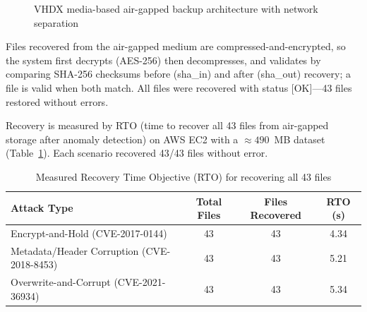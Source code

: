\documentclass{iaesarticle}
\begin{document}
\begin{figure}[htbp]
\centering
{}
\vspace{.4em}
\caption{VHDX media-based air-gapped backup architecture with network separation}
\label{fig:vhdx}
\end{figure}

Files recovered from the air-gapped medium are compressed-and-encrypted, so the system first decrypts (AES-256) then decompresses, and validates by comparing SHA-256 checksums before (sha\_in) and after (sha\_out) recovery; a file is valid when both match. All files were recovered with status [OK]---43 files restored without errors.

Recovery is measured by RTO (time to recover all 43 files from air-gapped storage after anomaly detection) on AWS EC2 with a $\approx490$~MB dataset (Table~\ref{tab:rto}). Each scenario recovered 43/43 files without error.

\begin{table}[htbp]
\centering
\fontsize{8pt}{10pt}\selectfont
\caption{Measured Recovery Time Objective (RTO) for recovering all 43 files}
\label{tab:rto}
\begin{tabular}{l c c c}
\hline
\textbf{Attack Type} & \textbf{Total Files} & \textbf{Files Recovered} & \textbf{RTO (s)} \\
\hline
Encrypt-and-Hold (CVE-2017-0144)           & 43 & 43 & 4.34 \\
Metadata/Header Corruption (CVE-2018-8453) & 43 & 43 & 5.21 \\
Overwrite-and-Corrupt (CVE-2021-36934)     & 43 & 43 & 5.34 \\
\hline
\end{tabular}
\end{table}
\end{document}
